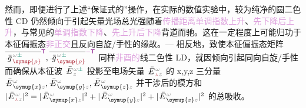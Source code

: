 
然而，即便进行了上述“保证式的”操作，在实际的数值实验中，较为纯净的\textcolor{NavyBlue}{圆二色性 CD} 仍然倾向于引起\textcolor{PineGreen}{矢量光场}\textcolor{NavyBlue}{总光强}随着\textcolor{Plum}{传播距离}\textcolor{Plum}{单调指数上升}、\textcolor{Plum}{先下降后上升}，与常见的\textcolor{Plum}{单调指数下降}、\textcolor{Plum}{先上升后下降}背道而驰。这在一定程度上可能归功于\textcolor{PineGreen}{本征偏振态}\textcolor{Plum}{非正交}且\textcolor{NavyBlue}{反向自旋}/\textcolor{NavyBlue}{手性}的缘故。--- 相反地，致使\textcolor{PineGreen}{本征偏振态矩阵} $\overline{\Xint{{}^{}_{\mathcolor{gray}{-}}}{10}{\bar{g}}^{\;\!\mathcolor{gray}{\omega} \textcolor{PineGreen}{\pm}}_{\;\! \textcolor{Maroon}{\symup{\rho}}}}^{\mathsf{\textcolor{Plum}{T}}}, \overline{\Xint{{}^{}_{\mathcolor{gray}{-}}}{10}{\bar{g}}^{\;\!\mathcolor{gray}{\omega} \textcolor{PineGreen}{\pm}}_{\;\! \textcolor{Maroon}{\symup{\rho}}}}^{\textcolor{Plum}{-\mathsf{T}}}$ 同样\textcolor{Plum}{非酉的}\textcolor{NavyBlue}{线二色性 LD}，就因倾向引起\textcolor{NavyBlue}{同向自旋}/\textcolor{NavyBlue}{手性}而确保从\textcolor{PineGreen}{本征波} $\Xint{\mathcolor{gray}{-}}{25}{\bar{E}}^{\;\!\mathcolor{gray}{\omega} \textcolor{PineGreen}{\pm}}_{\;\! \mathcolor{gray}{z}}$ 投影至电场矢量 $\Xint{\mathcolor{gray}{-}}{25}{\bar{E}}^{\;\!\mathcolor{gray}{\omega}}_{\;\! \textcolor{Maroon}{\Yup} \mathcolor{gray}{z}}$ 的 x,y,z 三分量 $\Xint{\mathcolor{gray}{-}}{25}{\bar{E}}^{\;\!\mathcolor{gray}{\omega}}_{\;\! \symup{x} \mathcolor{gray}{z}}, \Xint{\mathcolor{gray}{-}}{25}{\bar{E}}^{\;\!\mathcolor{gray}{\omega}}_{\;\! \symup{y} \mathcolor{gray}{z}}, \Xint{\mathcolor{gray}{-}}{25}{\bar{E}}^{\;\!\mathcolor{gray}{\omega}}_{\;\! \symup{z} \mathcolor{gray}{z}}$ 并\textcolor{PineGreen}{干涉}后的模方和 $\lvert \Xint{\mathcolor{gray}{-}}{25}{\bar{E}}^{\;\!\mathcolor{gray}{\omega}}_{\;\! \textcolor{Maroon}{\Yup} \mathcolor{gray}{z}} \rvert^2 = \lvert \Xint{\mathcolor{gray}{-}}{25}{\bar{E}}^{\;\!\mathcolor{gray}{\omega}}_{\;\! \symup{x} \mathcolor{gray}{z}} \rvert^2 + \lvert \Xint{\mathcolor{gray}{-}}{25}{\bar{E}}^{\;\!\mathcolor{gray}{\omega}}_{\;\! \symup{y} \mathcolor{gray}{z}} \rvert^2 + \lvert \Xint{\mathcolor{gray}{-}}{25}{\bar{E}}^{\;\!\mathcolor{gray}{\omega}}_{\;\! \symup{z} \mathcolor{gray}{z}} \rvert^2$ 的总\textcolor{NavyBlue}{吸收}。

